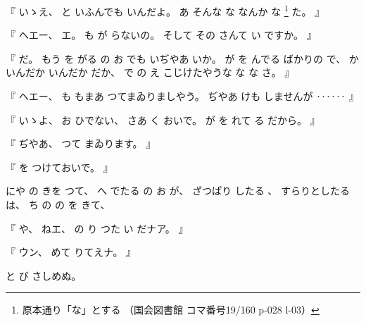 %
『
いゝえ、%
%
と
いふんでも
いんだよ。
%
あ
そんな
な
なんか
な
\footnote{原本通り「な」とする
（国会図書館 コマ番号19/160 p-028 l-03）}%
た。
』

%
『
ヘエー、
%
エ。
%
も
が
らないの。
%
そして
その
さんて
い
ですか。
』

%
『
だ。
%
もう
を
がる
の
お
でも
いぢやあ
いか。
%
が
を
んでる
ばかりの
で、
%
かいんだか
いんだか
だか、
%
で
の
え
こじけたやうな
な
な
さ。
』

%
『
ヘエー、
%
も
もまあ
つてまゐりましやう。
%
ぢやあ
けも
しませんが
‥‥‥
』

%
『
いゝよ、%
%
お
ひでない、
%
さあ
く
おいで。
%
が
を
れて
る
だから。
』

%
『
ぢやあ、
%
つて
まゐります。
』

%
『
を
つけておいで。
』

%
にや
の%
きを
つて、
%
へ
でたる
の
お
が、
%
ざつぱり
したる
、
%
すらりとしたる
は、
%
ち
の
の
を
きて、

%
『
や、
%
ねエ、
%
の
り
つた
い
だナア。
』

%
『
ウン、
%
めて
りてえナ。
』

%
と
び
さしめぬ。

